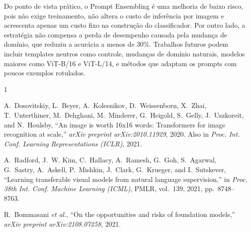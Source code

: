 \documentclass[conference]{IEEEtran}
\begin{document}
Do ponto de vista prático, o Prompt Ensembling é uma melhoria de baixo risco, pois não exige treinamento, não altera o custo de inferência por imagem e acrescenta apenas um custo fixo na construção do classificador. Por outro lado, a estratégia não compensa a perda de desempenho causada pela mudança de domínio, que reduziu a acurácia a menos de 30\%. Trabalhos futuros podem incluir templates neutros como controle, mudanças de domínio naturais, modelos maiores como ViT-B/16 e ViT-L/14, e métodos que adaptam os prompts com poucos exemplos rotulados.

\begin{thebibliography}{1}

A.~Dosovitskiy, L.~Beyer, A.~Kolesnikov, D.~Weissenborn, X.~Zhai, T.~Unterthiner, M.~Dehghani, M.~Minderer, G.~Heigold, S.~Gelly, J.~Uszkoreit, and N.~Houlsby, ``An image is worth 16x16 words: Transformers for image recognition at scale,'' \textit{arXiv preprint arXiv:2010.11929}, 2020. Also in \textit{Proc. Int. Conf. Learning Representations (ICLR)}, 2021.

A.~Radford, J.~W. Kim, C.~Hallacy, A.~Ramesh, G.~Goh, S.~Agarwal, G.~Sastry, A.~Askell, P.~Mishkin, J.~Clark, G.~Krueger, and I.~Sutskever, ``Learning transferable visual models from natural language supervision,'' in \textit{Proc. 38th Int. Conf. Machine Learning (ICML)}, PMLR, vol.~139, 2021, pp.~8748--8763.

R.~Bommasani \textit{et al.}, ``On the opportunities and risks of foundation models,'' \textit{arXiv preprint arXiv:2108.07258}, 2021.

\end{thebibliography}
\end{document}
